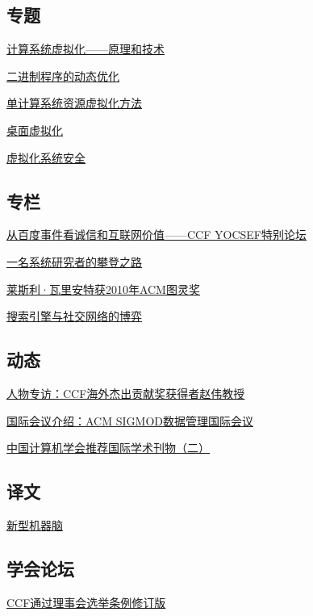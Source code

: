 \documentclass[a4paper]{article}
\begin{document}
\subsection{专题}
\href{http://history.ccf.org.cn/resources/1190201776262/2011/09/20/1.pdf}{计算系统虚拟化——原理和技术}

\href{http://history.ccf.org.cn/resources/1190201776262/2011/09/20/2.pdf}{二进制程序的动态优化}

\href{http://history.ccf.org.cn/resources/1190201776262/2011/09/20/3.pdf}{单计算系统资源虚拟化方法}

\href{http://history.ccf.org.cn/resources/1190201776262/2011/09/20/4.pdf}{桌面虚拟化}

\href{http://history.ccf.org.cn/resources/1190201776262/2011/09/20/5.pdf}{虚拟化系统安全}

\subsection{专栏}
\href{http://history.ccf.org.cn/resources/1190201776262/2011/09/21/6.pdf}{从百度事件看诚信和互联网价值——CCF YOCSEF特别论坛}

\href{http://history.ccf.org.cn/resources/1190201776262/2011/09/21/7.pdf}{一名系统研究者的攀登之路}

\href{http://history.ccf.org.cn/resources/1190201776262/2011/09/21/8.pdf}{莱斯利·瓦里安特获2010年ACM图灵奖}

\href{http://history.ccf.org.cn/resources/1190201776262/2011/09/21/9.pdf}{搜索引擎与社交网络的博弈}

\subsection{动态}
\href{http://history.ccf.org.cn/resources/1190201776262/2011/09/21/10.pdf}{人物专访：CCF海外杰出贡献奖获得者赵伟教授}

\href{http://history.ccf.org.cn/resources/1190201776262/2011/09/21/11.pdf}{国际会议介绍：ACM SIGMOD数据管理国际会议}

\href{http://history.ccf.org.cn/resources/1190201776262/2011/09/21/12.pdf}{中国计算机学会推荐国际学术刊物（二）}

\subsection{译文}
\href{http://history.ccf.org.cn/resources/1190201776262/2011/09/21/13.pdf}{新型机器脑}

\subsection{学会论坛}
\href{http://history.ccf.org.cn/resources/1190201776262/2011/09/21/14.pdf}{CCF通过理事会选举条例修订版}
\end{document}
